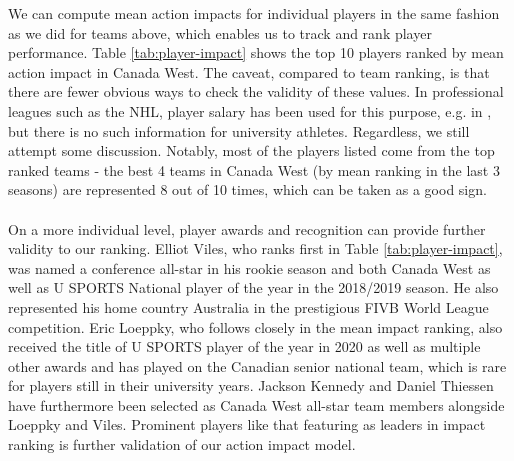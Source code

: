 \documentclass{sfuthesis}
\begin{document}
	We can compute mean action impacts for individual players in the same fashion as we did for teams above, which enables us to track and rank player performance. Table \ref{tab:player-impact} shows the top 10 players ranked by mean action impact in Canada West. The caveat, compared to team ranking, is that there are fewer obvious ways to check the validity of these values. In professional leagues such as the NHL, player salary has been used for this purpose, e.g. in \cite{schulte2017apples}, but there is no such information for university athletes. Regardless, we still attempt some discussion. Notably, most of the players listed come from the top ranked teams - the best 4 teams in Canada West (by mean ranking in the last 3 seasons) are represented 8 out of 10 times, which can be taken as a good sign.\\\\
	On a more individual level, player awards and recognition can provide further validity to our ranking. Elliot Viles, who ranks first in Table \ref{tab:player-impact}, was named a conference all-star in his rookie season and both Canada West as well as U SPORTS National player of the year in the 2018/2019 season. He also represented his home country Australia in the prestigious FIVB World League competition. Eric Loeppky, who follows closely in the mean impact ranking, also received the title of U SPORTS player of the year in 2020 as well as multiple other awards and has played on the Canadian senior national team, which is rare for players still in their university years. Jackson Kennedy and Daniel Thiessen have furthermore been selected as Canada West all-star team members alongside Loeppky and Viles. Prominent players like that featuring as leaders in impact ranking is further validation of our action impact model.
\end{document}
